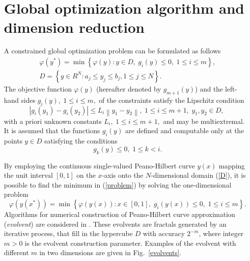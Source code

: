 \documentclass{llncs}
\begin{document}
\section{Global optimization algorithm and dimension reduction}

A constrained global optimization problem can be formulated as follows
\begin{gather}\label{problem}
\varphi(y^\ast)=\min{\left\{\varphi(y):y\in D, \; g_i(y)\leq 0, \; 1 \leq i \leq m\right\}},\\
D=\left\{y\in R^N: a_j\leq y_j \leq b_j, 1\leq j \leq N \right\}.\label{D}
\end{gather}
The objective function $\varphi(y)$ (hereafter denoted by $g_{m+1}(y)$) and the left-hand 
sides $g_i(y), \; 1\leq i \leq m,$ of the constraints satisfy the Lipschitz condition 
\[
\left|g_i(y_1)-g_i(y_2)\right|\leq L_i\left\|y_1-y_2\right\|, \;1\leq i\leq m+1, \; y_1,y_2 \in D,\;
\]
with a priori unknown constants $L_i, \; 1 \leq i \leq m+1,$ and may be multiextremal. It is 
assumed that the functions $g_i(y)$ are defined and computable only at the points $y \in D$ 
satisfying the conditions
\begin{equation}\label{g_k}
g_k(y) \leq 0, \; 1 \leq k < i.
\end{equation}

By employing the continuous single-valued Peano-Hilbert curve $y(x)$ mapping the unit 
interval 
$[0,1]$ on the $x$-axis onto the $N$-dimensional domain (\ref{D}), it is possible to find the 
minimum in (\ref{problem}) by solving the one-dimensional problem
\[
\varphi(y(x^\ast))=\min \left\{\varphi(y(x)): x \in [0,1], \; g_i(y(x))\leq 0, \; 1 \leq i \leq m\right\}.
\]
Algorithms for numerical construction of Peano-Hilbert curve approximation (\textit{evolvent}) are 
considered in \cite{Strongin2000,Strongin2013}. These evolvents are fractals generated by an iterative
process, that fill in the hypercube $D$ with accuracy $2^{-m}$, where integer $m>0$ is the 
evolvent construction parameter. Examples of the evolvent with different $m$ in two dimensions are given in Fig.~\ref{evolvents}.
\end{document}
